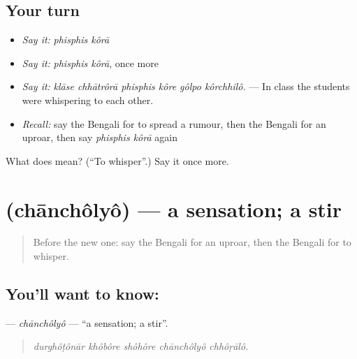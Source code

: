 \subsection*{Your turn}
\begin{itemize}
\raggedright
  \item \emph{Say it:} \emph{phisphis kôrā}
  \item \emph{Say it:} \emph{phisphis kôrā}, once more
  \item \emph{Say it:} \emph{klāse chhātrôrā phisphis kôre gôlpo kôrchhilô.} — In class the students were whispering to each other.
  \item \emph{Recall:} say the Bengali for to spread a rumour, then the Bengali for an uproar, then say \emph{phisphis kôrā} again
\end{itemize}

\begin{tcolorbox}[breakable,colback=teal!4,colframe=teal!35!black,title={Before you move on}]
What does   mean? (\textquotedblleft{}To whisper\textquotedblright{}.) Say it once more.
\end{tcolorbox}
\section[\texorpdfstring{\bn{চাঞ্চল্য} (chānchôlyô)}{চাঞ্চল্য (chānchôlyô)}]{ (chānchôlyô) — a sensation; a stir}

\label{lesson:BN-C298-chancholyo}



\begin{quote}
Before the new one: say the Bengali for an uproar, then the Bengali for to whisper.
\end{quote}

\subsection*{You'll want to know: }
\textbf{} — \emph{chānchôlyô} — \textquotedblleft{}a sensation; a stir\textquotedblright{}.

\begin{quote}
    
\end{quote}

\begin{quote}
\emph{durghôṭônār khôbôre shôhôre chānchôlyô chhôṛālô.}
\end{quote}

